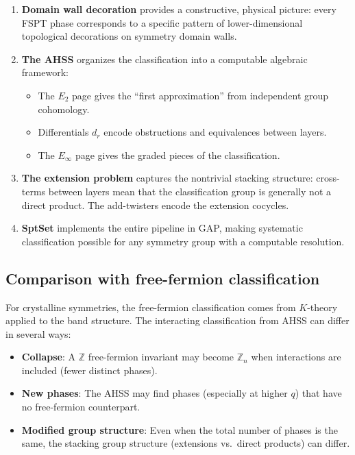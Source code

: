 \documentclass{SciPost}
\theoremstyle{definition}
\newcommand{\Z}{\mathbb{Z}}
\begin{document}
\begin{enumerate}
    \item \textbf{Domain wall decoration} provides a constructive, physical picture: every FSPT phase corresponds to a specific pattern of lower-dimensional topological decorations on symmetry domain walls.
    
    \item \textbf{The AHSS} organizes the classification into a computable algebraic framework:
    \begin{itemize}
        \item The $E_2$ page gives the ``first approximation'' from independent group cohomology.
        \item Differentials $d_r$ encode obstructions and equivalences between layers.
        \item The $E_\infty$ page gives the graded pieces of the classification.
    \end{itemize}
    
    \item \textbf{The extension problem} captures the nontrivial stacking structure: cross-terms between layers mean that the classification group is generally not a direct product.
    The add-twisters encode the extension cocycles.
    
    \item \textbf{SptSet} implements the entire pipeline in GAP, making systematic classification possible for any symmetry group with a computable resolution.
\end{enumerate}

\subsection{Comparison with free-fermion classification}

For crystalline symmetries, the free-fermion classification comes from $K$-theory applied to the band structure.
The interacting classification from AHSS can differ in several ways:
\begin{itemize}
    \item \textbf{Collapse}: A $\Z$ free-fermion invariant may become $\Z_n$ when interactions are included (fewer distinct phases).
    \item \textbf{New phases}: The AHSS may find phases (especially at higher $q$) that have no free-fermion counterpart.
    \item \textbf{Modified group structure}: Even when the total number of phases is the same, the stacking group structure (extensions vs.\ direct products) can differ.
\end{itemize}
\end{document}
